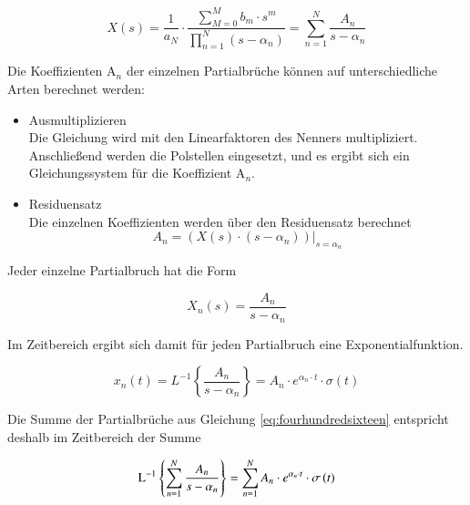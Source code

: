 \begin{equation}\label{eq:fourhundredsixteen}
X\left(s\right)=\frac{1}{a_{N} } \cdot \frac{\sum _{M=0}^{M}b_{m} \cdot s^{m}  }{\prod _{n=1}^{N}\left(s-\alpha _{n} \right) } =\sum _{n=1}^{N}\frac{A_{n} }{s-\alpha _{n} } 
\end{equation}

\noindent Die Koeffizienten A$_{n}$ der einzelnen Partialbrüche können auf unterschiedliche Arten berechnet werden:

\begin{itemize}
\item  Ausmultiplizieren\\
Die Gleichung wird mit den Linearfaktoren des Nenners multipliziert. Anschlie{\ss}end werden die Polstellen eingesetzt, und es ergibt sich ein Gleichungssystem für die Koeffizient A$_{n}$. 

\item  Residuensatz\\
Die einzelnen Koeffizienten werden über den Residuensatz berechnet \\
\begin{equation}\label{eq:fourhundredseventeen}
A_{n} =\left. \left(X\left(s\right)\cdot \left(s-\alpha _{n} \right)\right)\right|_{s=\alpha _{n} } 
\end{equation}
\end{itemize}

\noindent Jeder einzelne Partialbruch hat die Form 

\begin{equation}\label{eq:fourhundredeighteen}
X_{n} \left(s\right)=\frac{A_{n} }{s-\alpha _{n} }
\end{equation}

\noindent Im Zeitbereich ergibt sich damit für jeden Partialbruch eine Exponentialfunktion.

\begin{equation}\label{eq:fourhundrednineteen}
x_{n} \left(t\right)=L^{-1} \left\{\frac{A_{n} }{s-\alpha _{n} } \right\}=A_{n} \cdot e^{\alpha _{n} \cdot t} \cdot \sigma \left(t\right)
\end{equation}

Die Summe der Partialbrüche aus Gleichung \eqref{eq:fourhundredsixteen} entspricht deshalb im Zeitbereich der Summe

\begin{equation}\label{eq:fourhundredtwenty}
{\rm L}^{-1} \left\{\sum _{n=1}^{N}\frac{A_{n} }{s-\alpha _{n} }  \right\}=\sum _{n=1}^{N}A_{n} \cdot e^{\alpha _{n} \cdot t} \cdot \sigma \left(t\right) 
\end{equation}\bigskip

